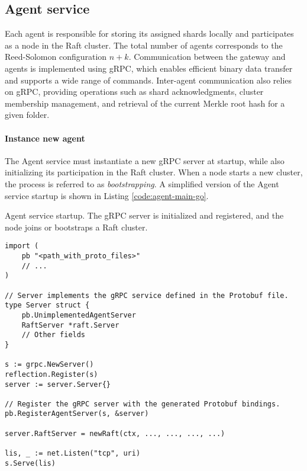 \newpage

\subsection{Agent service}

Each agent is responsible for storing its assigned shards locally and participates as a node in the Raft cluster. The total number of agents corresponds to the Reed-Solomon configuration $n+k$. Communication between the gateway and agents is implemented using gRPC, which enables efficient binary data transfer and supports a wide range of commands. Inter-agent communication also relies on gRPC, providing operations such as shard acknowledgments, cluster membership management, and retrieval of the current Merkle root hash for a given folder.

\paragraph{Instance new agent}

The Agent service must instantiate a new gRPC server at startup, while also initializing its participation in the Raft cluster. When a node starts a new cluster, the process is referred to as \emph{bootstrapping}. A simplified version of the Agent service startup is shown in Listing \ref{code:agent-main-go}.

\begin{listing}[H]
\caption{Agent service startup. The gRPC server is initialized and registered, and the node joins or bootstraps a Raft cluster.}
\label{code:agent-main-go}
\begin{verbatim}
import (
    pb "<path_with_proto_files>"
    // ...
)

// Server implements the gRPC service defined in the Protobuf file.
type Server struct {
    pb.UnimplementedAgentServer
    RaftServer *raft.Server
    // Other fields
}

s := grpc.NewServer()
reflection.Register(s)
server := server.Server{}

// Register the gRPC server with the generated Protobuf bindings.
pb.RegisterAgentServer(s, &server)

server.RaftServer = newRaft(ctx, ..., ..., ..., ...)

lis, _ := net.Listen("tcp", uri)
s.Serve(lis)
\end{verbatim}
\end{listing}

